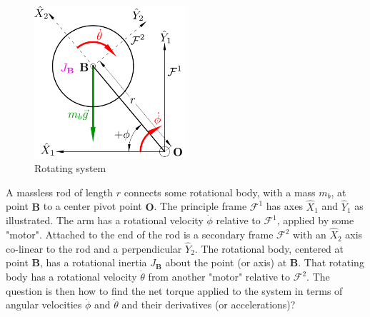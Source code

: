 \begin{figure}[htbp]
\centering
\includegraphics[width=0.5\textwidth]{figs/lemma-1}
\vspace{-6pt}
\caption{Rotating system}
\label{fig:lemma-1}
\vspace{-18pt}
\end{figure} 
\par
A massless rod of length $r$ connects some rotational body, with a mass $m_b$, at point $\mathbf{B}$ to a center pivot point $\mathbf{O}$. The principle frame $\mathcal{F}^{1}$ has axes $\hat{X}_1$ and $\hat{Y}_1$ as illustrated. The arm has a rotational velocity $\dot{\phi}$ relative to $\mathcal{F}^{1}$, applied by some "motor". Attached to the end of the rod is a secondary frame $\mathcal{F}^2$ with an $\hat{X}_2$ axis co-linear to the rod and a perpendicular $\hat{Y}_2$. The rotational body, centered at point $\mathbf{B}$, has a rotational inertia $J_\mathbf{B}$ about the point (or axis) at $\mathbf{B}$. That rotating body has a rotational velocity $\dot{\theta}$ from another "motor" relative to $\mathcal{F}^2$. The question is then how to find the net torque applied to the system in terms of angular velocities $\dot{\phi}$ and $\dot{\theta}$ and their derivatives (or accelerations)?
